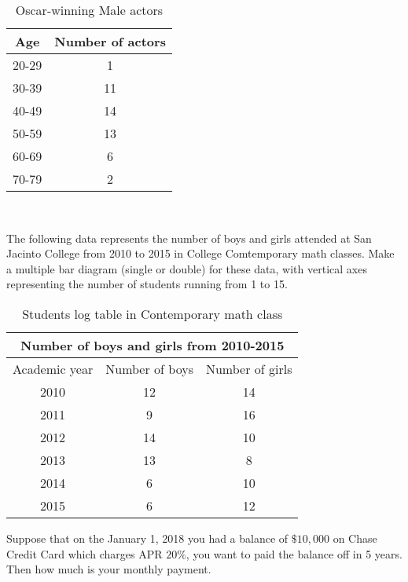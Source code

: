 \documentclass[11pt]{exam}
\begin{document}
\begin{questions}
\begin{table}[h]
\begin{tabular}{|c|c|}
		Age    &   Number of actors         \\ \hline
		20-29 &   1             \\ \hline          
		30-39    &   11  \\ \hline
		40-49          &  14          \\ \hline
		50-59  &   13              \\ \hline
		60-69       &  6     \\ \hline
		70-79          &   2         \\ \hline
		
	\end{tabular}
	\caption{Oscar-winning Male actors}
	\label{tab:msg1}                            
	
\end{table}\\
\newpage

\question[7] The following data represents the number of boys and girls attended at San Jacinto College from 2010 to 2015 in College Comtemporary math classes. Make a multiple bar diagram (single or double) for these data, with vertical axes representing the number of students running from 1 to 15.  \begin{table}[h]                           
	\centering
	\begin{tabular}{|c|c|c|}
		\hline
		\multicolumn{3}{c|}{\textbf{Number of boys and girls from 2010-2015}} \\ \hline
		
		Academic year    &   Number of boys   &   Number of girls      \\ \hline
		2010 &   12 &   14             \\ \hline          
		2011    &   9 &   16  \\ \hline
		2012       &  14 &   10           \\ \hline
		2013  &   13 &   8              \\ \hline
		2014       &  6  &   10   \\ \hline
		2015        &   6 &   12          \\ \hline
		
	\end{tabular}
	\caption{Students log table in Contemporary math class}
	\label{tab:msg1}                            
	
\end{table}
\vspace{10cm}
\addpoints
\question[6 Bonus:] Suppose that on the January 1, 2018 you had a balance of $\$10,000$ on Chase Credit Card which charges APR $20\%$, you want to paid the balance off in 5 years. Then how much is your monthly payment. 
\end{questions}
\end{document}
